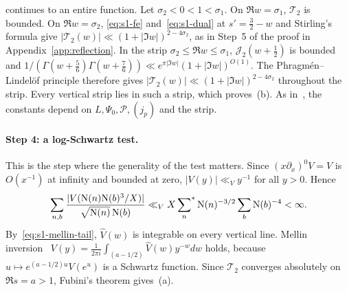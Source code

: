 \documentclass[11pt]{article}
\numberwithin{equation}{section}
\newcommand{\N}{\mathrm N}
\newcommand{\ssum}{\sideset{}{^*}\sum}
\begin{document}
continues to an entire function. Let $\sigma_2<0<1<\sigma_1$. On $\Re w=\sigma_1$, $\mathcal T_2$ is bounded. On
$\Re w=\sigma_2$, \eqref{eq:s1-fe} and~\eqref{eq:s1-dual} at $s'=\frac32-w$ and Stirling's formula give
$|\mathcal T_2(w)|\ll(1+|\Im w|)^{2-4\sigma_2}$, as in Step~5 of the proof in Appendix~\ref{app:reflection}. In the strip
$\sigma_2\le\Re w\le\sigma_1$, $\mathcal J_2(w+\frac12)$ is bounded and $1/(\Gamma(w+\frac56)\Gamma(w+\frac76))\ll
e^{\pi|\Im w|}(1+|\Im w|)^{O(1)}$. The Phragm\'en--Lindel\"of principle therefore gives
$|\mathcal T_2(w)|\ll(1+|\Im w|)^{2-4\sigma_2}$ throughout the strip. Every vertical strip lies in such a strip,
which proves~(b). As in~\cite{OAI78}, the constants depend on $L,\Psi_0,\mathcal P,(j_p)$ and the strip.

\paragraph{Step 4: a log-Schwartz test.} This is the step where the generality of the test matters. Since
$(x\partial_x)^0V=V$ is $O(x^{-1})$ at infinity and bounded at zero, $|V(y)|\ll_V y^{-1}$ for all $y>0$. Hence
\begin{equation}\label{eq:d134}
 \sum_{n,b}\frac{|V(\N(n)\N(b)^3/X)|}{\sqrt{\N(n)}\,\N(b)}\ll_V X\ssum_n\N(n)^{-3/2}\sum_b\N(b)^{-4}<\infty .
\end{equation}
By~\eqref{eq:s1-mellin-tail}, $\widehat V(w)$ is integrable on every vertical line. Mellin inversion~\cite[\S1.14(iv)]{DLMF}
$V(y)=\frac1{2\pi i}\int_{(a-1/2)}\widehat V(w)y^{-w}dw$ holds, because $u\mapsto e^{(a-1/2)u}V(e^u)$ is a
Schwartz function. Since $\mathcal T_2$ converges absolutely on $\Re s=a>1$, Fubini's theorem gives~(a).
\end{document}
